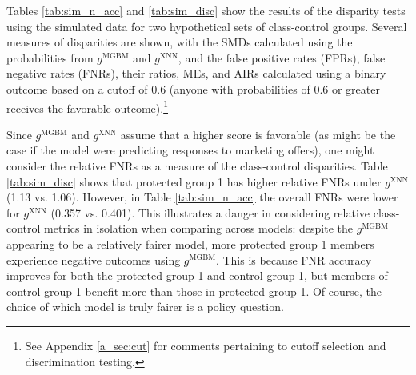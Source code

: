 \documentclass[information,article,submit,moreauthors,pdftex]{definitions/mdpi}
\begin{document}
Tables \ref{tab:sim_n_acc} and \ref{tab:sim_disc} show the results of the disparity tests using the simulated data for two hypothetical sets of class-control groups.  Several measures of disparities are shown, with the SMDs calculated using the probabilities from $g^{\text{MGBM}}$ and  $g^{\text{XNN}}$, and the false positive rates (FPRs), false negative rates (FNRs), their ratios, MEs, and AIRs calculated using a binary outcome based on a cutoff of 0.6 (anyone with probabilities of 0.6 or greater receives the favorable outcome).\footnote{See Appendix \ref{a_sec:cut} for comments pertaining to cutoff selection and discrimination testing.}

Since $g^{\text{MGBM}}$ and $g^{\text{XNN}}$ assume that a higher score is favorable (as might be the case if the model were predicting responses to marketing offers), one might consider the relative FNRs as a measure of the class-control disparities. Table \ref{tab:sim_disc} shows that protected group 1 has higher relative FNRs under $g^{\text{XNN}}$ (1.13 vs. 1.06).  However, in Table \ref{tab:sim_n_acc} the overall FNRs were lower for  $g^{\text{XNN}}$ (0.357 vs. 0.401). This illustrates a danger in considering relative class-control metrics in isolation when comparing across models: despite the $g^\text{MGBM}$ appearing to be a relatively fairer model, more protected group 1 members experience negative outcomes using $g^{\text{MGBM}}$. This is because FNR accuracy improves for both the protected group 1 and control group 1, but members of control group 1 benefit more than those in protected group 1.  Of course, the choice of which model is truly fairer is a policy question.
\end{document}
